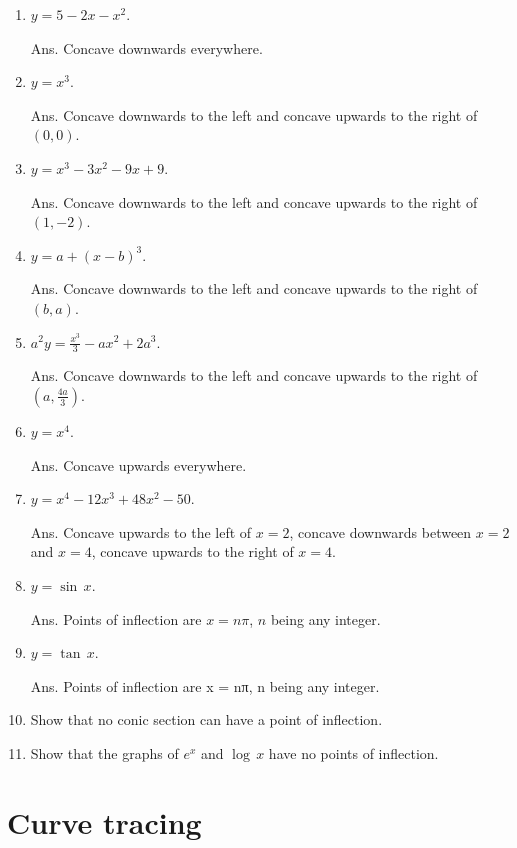 \begin{enumerate}
\item
$y = 5 - 2x - x^2$. 

Ans.  	Concave downwards everywhere.

\item
$y = x^3$. 	  	

Ans. Concave downwards to the left and concave upwards to the right of $(0, 0)$.

\item
$y = x^3 - 3x^2 - 9x + 9$. 

Ans.  	Concave downwards to the left and concave upwards to the right of $(1, -2)$.

\item
$y = a + (x - b)^3$. 	  	

Ans. Concave downwards to the left and concave upwards to the right of $(b, a)$.

\item
$a^2 y = \frac{x^3}{3} - a x^2 + 2 a^3$.

Ans. Concave downwards to the left and concave upwards to 
the right of $(a, \frac{4a}{3})$.

\item
$y = x^4$. 	  	

Ans. Concave upwards everywhere.

\item
$y = x^4 - 12x^3 + 48x^2 - 50$. 	

Ans. Concave upwards to the left of $x = 2$, concave downwards 
between $x = 2$ and $x = 4$, concave upwards to the right of $x = 4$.

\item
$y = \sin\, x$. 

Ans. 	Points of inflection are $x = n\pi$, $n$ being any integer.

\item
$y = \tan\,x$. 	

Ans. 	Points of inflection are x = nπ, n being any integer.

\item
Show that no conic section can have a point of inflection.

\item
Show that the graphs of $e^x$ and $\log\, x$ have no points of inflection.

\end{enumerate}

\section{Curve tracing}

